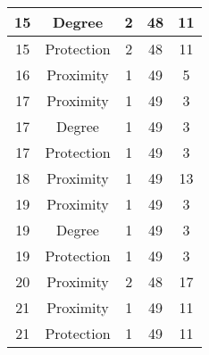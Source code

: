 \documentclass[results.tex]{subfiles}
\begin{document}
\begin{center}
\begin{tabular}{| c || c | c | c | c |}
            \hline
            15                      & Degree                       & 2                      & 48                      & 11                   \\
            \hline
            15                      & Protection                   & 2                      & 48                      & 11                   \\
            \hline
            16                      & Proximity                    & 1                      & 49                      & 5                    \\
            \hline
            17                      & Proximity                    & 1                      & 49                      & 3                    \\
            \hline
            17                      & Degree                       & 1                      & 49                      & 3                    \\
            \hline
            17                      & Protection                   & 1                      & 49                      & 3                    \\
            \hline
            18                      & Proximity                    & 1                      & 49                      & 13                   \\
            \hline
            19                      & Proximity                    & 1                      & 49                      & 3                    \\
            \hline
            19                      & Degree                       & 1                      & 49                      & 3                    \\
            \hline
            19                      & Protection                   & 1                      & 49                      & 3                    \\
            \hline
            20                      & Proximity                    & 2                      & 48                      & 17                   \\
            \hline
            21                      & Proximity                    & 1                      & 49                      & 11                   \\
            \hline
            21                      & Protection                   & 1                      & 49                      & 11                   \\

\end{tabular}
\end{center}
\end{document}
